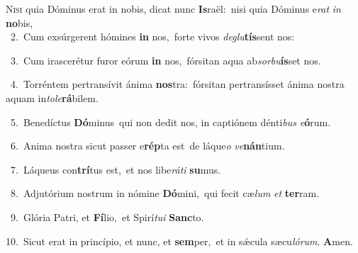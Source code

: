 \lettrine{\initial\textcolor{\initialcolor}{N}}{isi} quia Dóminus erat in nobis, dicat nunc \textbf{Is}\-raël:~\star nisi quia Dóminus e\textit{rat} \textit{in} \textbf{no}\-bis,\\
{\numbfont\textcolor{\numbcolor}{~2.}}~Cum exsúrgerent hómines \textbf{in} nos,~\star forte vivos \textit{de}\-\textit{glu}\textbf{tís}sent nos:\par
{\numbfont\textcolor{\numbcolor}{~3.}}~Cum irascerétur furor eórum \textbf{in} nos,~\star fórsitan aqua ab\-\textit{sor}\-\textit{bu}\textbf{ís}set nos.\par
{\numbfont\textcolor{\numbcolor}{~4.}}~Torréntem pertransívit ánima \textbf{nos}\-tra:~\star fórsitan pertransísset ánima nostra aquam in\-\textit{to}\-\textit{le}\textbf{rá}bilem.\par
{\numbfont\textcolor{\numbcolor}{~5.}}~Benedíctus \textbf{Dó}\-minus~\star qui non dedit nos, in captiónem dénti\textit{bus} \textit{e}\-\textbf{ó}rum.\par
{\numbfont\textcolor{\numbcolor}{~6.}}~Anima nostra sicut passer e\-\textbf{rép}\-ta est~\star de láque\textit{o} \textit{ve}\-\textbf{nán}tium.\par
{\numbfont\textcolor{\numbcolor}{~7.}}~Láqueus con\-\textbf{trí}\-tus est,~\star et nos libe\-\textit{rá}\-\textit{ti} \textbf{su}\-mus.\par
{\numbfont\textcolor{\numbcolor}{~8.}}~Adjutórium nostrum in nómine \textbf{Dó}\-mini,~\star qui fecit cæ\textit{lum} \textit{et} \textbf{ter}\-ram.\par
{\numbfont\textcolor{\numbcolor}{~9.}}~Glória Patri, et \textbf{Fí}\-lio,~\star et Spirí\-\textit{tu}\-\textit{i} \textbf{Sanc}\-to.\par
{\numbfont\textcolor{\numbcolor}{10.}}~Sicut erat in princípio, et nunc, et \textbf{sem}\-per,~\star et in sǽcula sæcu\-\textit{ló}\-\textit{rum}. \textbf{A}\-men.\par

